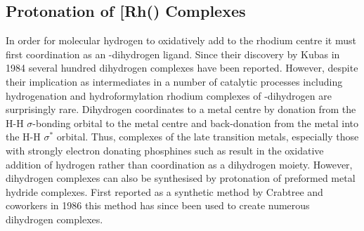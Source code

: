 
\subsection{Protonation of \texorpdfstring{[Rh(\tButhixantphos)\ce{Cl(H)2]}} R Complexes}

In order for molecular hydrogen to oxidatively add to the rhodium centre it must first coordination as an -dihydrogen ligand.  Since their discovery by Kubas in 1984\cite{Kubas1984} several hundred dihydrogen complexes have been reported.\cite{McGrady2003}  However, despite their implication as intermediates in a number of catalytic processes including hydrogenation and hydroformylation rhodium complexes of -dihydrogen are surprisingly rare.  Dihydrogen coordinates to a metal centre by donation from the H-H $\sigma$-bonding orbital to the metal centre and back-donation from the metal into the H-H $\sigma^*$ orbital.  Thus, complexes of the late transition metals, especially those with strongly electron donating phosphines such as \tBuxantphos{} result in the oxidative addition of hydrogen rather than coordination as a dihydrogen moiety.  However, dihydrogen complexes can also be synthesised by protonation of preformed metal hydride complexes.  First reported as a synthetic method by Crabtree and coworkers in 1986\cite{Crabtree1986} this method has since been used to create numerous dihydrogen complexes\cite{Janak2004, Oldham1997, Pons2004, Heinekey1993}.


